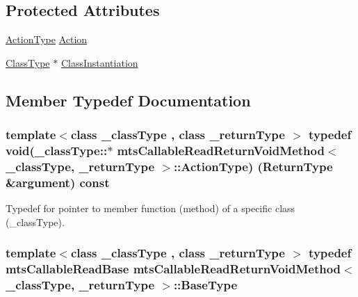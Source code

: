 \subsection*{Protected Attributes}
\begin{DoxyCompactItemize}
\item 
\hyperlink{classmts_callable_read_return_void_method_a97673cc9242251e406bde738cb060781}{Action\+Type} \hyperlink{classmts_callable_read_return_void_method_a869753a539aea4804f5b0e928786b83a}{Action}
\item 
\hyperlink{classmts_callable_read_return_void_method_a694e26a4c7fc28f0c739aa2f2ab97e12}{Class\+Type} $\ast$ \hyperlink{classmts_callable_read_return_void_method_af6aea9b2b635f8ea4be1f2946fa7f1c7}{Class\+Instantiation}
\end{DoxyCompactItemize}


\subsection{Member Typedef Documentation}
\hypertarget{classmts_callable_read_return_void_method_a97673cc9242251e406bde738cb060781}{}
\subsubsection[{Action\+Type}]{\setlength{\rightskip}{0pt plus 5cm}template$<$class \+\_\+class\+Type , class \+\_\+return\+Type $>$ typedef void(\+\_\+class\+Type\+::$\ast$ {\bf mts\+Callable\+Read\+Return\+Void\+Method}$<$ \+\_\+class\+Type, \+\_\+return\+Type $>$\+::Action\+Type) ({\bf Return\+Type} \&argument) const }\label{classmts_callable_read_return_void_method_a97673cc9242251e406bde738cb060781}
Typedef for pointer to member function (method) of a specific class (\+\_\+class\+Type). \hypertarget{classmts_callable_read_return_void_method_a9dbeaf2b51dba8323c5672945801307c}{}
\subsubsection[{Base\+Type}]{\setlength{\rightskip}{0pt plus 5cm}template$<$class \+\_\+class\+Type , class \+\_\+return\+Type $>$ typedef {\bf mts\+Callable\+Read\+Base} {\bf mts\+Callable\+Read\+Return\+Void\+Method}$<$ \+\_\+class\+Type, \+\_\+return\+Type $>$\+::{\bf Base\+Type}}\label{classmts_callable_read_return_void_method_a9dbeaf2b51dba8323c5672945801307c}
\hypertarget{classmts_callable_read_return_void_method_a694e26a4c7fc28f0c739aa2f2ab97e12}{}
